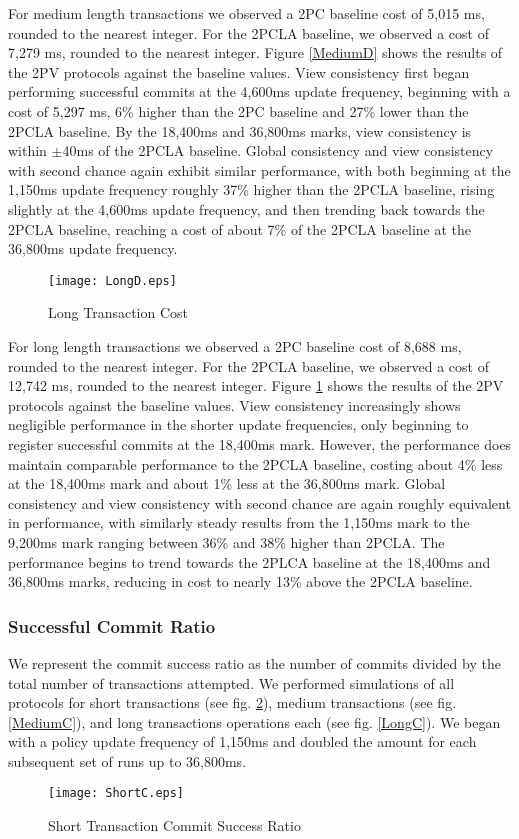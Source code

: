 \documentclass[11pt]{article}
\begin{document}
For medium length transactions we observed a 2PC baseline cost of 5,015 ms, rounded to the nearest integer. For the 2PCLA baseline, we observed a cost of 7,279 ms, rounded to the nearest integer. Figure \ref{MediumD} shows the results of the 2PV protocols against the baseline values. View consistency first began performing successful commits at the 4,600ms update frequency, beginning with a cost of 5,297 ms, 6\% higher than the 2PC baseline and 27\% lower than the 2PCLA baseline. By the 18,400ms and 36,800ms marks, view consistency is within $\pm$40ms of the 2PCLA baseline. Global consistency and view consistency with second chance again exhibit similar performance, with both beginning at the 1,150ms update frequency roughly 37\% higher than the 2PCLA baseline, rising slightly at the 4,600ms update frequency, and then trending back towards the 2PCLA baseline, reaching a cost of about 7\% of the 2PCLA baseline at the 36,800ms update frequency.
\begin{figure}[h]
\begin{center}
\texttt{[image: LongD.eps]}
\caption{Long Transaction Cost}
\label{LongD}
\end{center}
\end{figure}

For long length transactions we observed a 2PC baseline cost of 8,688 ms, rounded to the nearest integer. For the 2PCLA baseline, we observed a cost of 12,742 ms, rounded to the nearest integer. Figure \ref{LongD} shows the results of the 2PV protocols against the baseline values. View consistency increasingly shows negligible performance in the shorter update frequencies, only beginning to register successful commits at the 18,400ms mark. However, the performance does maintain comparable performance to the 2PCLA baseline, costing about 4\% less at the 18,400ms mark and about 1\% less at the 36,800ms mark. Global consistency and view consistency with second chance are again roughly equivalent in performance, with similarly steady results from the 1,150ms mark to the 9,200ms mark ranging between 36\% and 38\% higher than 2PCLA. The performance begins to trend towards the 2PLCA baseline at the 18,400ms and 36,800ms marks, reducing in cost to nearly 13\% above the 2PCLA baseline.
\subsubsection{Successful Commit Ratio}
We represent the commit success ratio as the number of commits divided by the total number of transactions attempted. We performed simulations of all protocols for short transactions (see fig. \ref{ShortC}), medium transactions (see fig. \ref{MediumC}), and long transactions operations each (see fig. \ref{LongC}). We began with a policy update frequency of 1,150ms and doubled the amount for each subsequent set of runs up to 36,800ms.
\begin{figure}[h]
\begin{center}
\texttt{[image: ShortC.eps]}
\caption{Short Transaction Commit Success Ratio}
\label{ShortC}
\end{center}
\end{figure}
\end{document}
